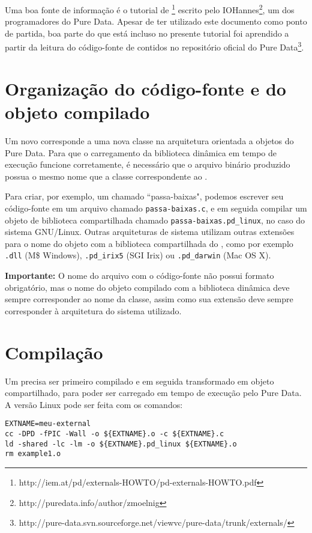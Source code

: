 Uma boa fonte de informação é o tutorial de
\externals\footnote{http://iem.at/pd/externals-HOWTO/pd-externals-HOWTO.pdf}
escrito pelo IOHannes\footnote{http://puredata.info/author/zmoelnig}, um dos
programadores do Pure Data. Apesar de ter utilizado este documento como ponto
de partida, boa parte do que está incluso no presente tutorial foi aprendido a
partir da leitura do código-fonte de \externals contidos no repositório
oficial do Pure
Data\footnote{http://pure-data.svn.sourceforge.net/viewvc/pure-data/trunk/externals/}.

\section{Organização do código-fonte e do objeto compilado}

Um novo \external corresponde a uma nova classe na arquitetura orientada a
objetos do Pure Data. Para que o carregamento da biblioteca dinâmica
em tempo de execução funcione corretamente, é necessário que o
arquivo binário produzido possua o mesmo nome que a classe correspondente ao
\external.

Para criar, por exemplo, um \external chamado ``passa-baixas", podemos
escrever seu código-fonte em um arquivo chamado \texttt{passa-baixas.c}, e em
seguida compilar um objeto de biblioteca compartilhada chamado
\texttt{passa-baixas.pd\_linux}, no caso do sistema GNU/Linux. Outras
arquiteturas de sistema utilizam outras extensões para o nome do objeto com a
biblioteca compartilhada do \external, como por exemplo \texttt{.dll} (M\$
Windows), \texttt{.pd\_irix5} (SGI Irix) ou \texttt{.pd\_darwin} (Mac OS X).

\textbf{Importante:} O nome do arquivo com o código-fonte não possui formato
obrigatório, mas o nome do objeto compilado com a biblioteca dinâmica deve
sempre corresponder ao nome da classe, assim como sua extensão deve sempre
corresponder à arquitetura do sistema utilizado.

\section{Compilação}

Um \external precisa ser primeiro compilado e em seguida transformado em
objeto compartilhado, para poder ser carregado em tempo de execução pelo Pure
Data. A versão Linux pode ser feita com os comandos:

\vspace{1em}
\begin{lstlisting}
EXTNAME=meu-external
cc -DPD -fPIC -Wall -o ${EXTNAME}.o -c ${EXTNAME}.c
ld -shared -lc -lm -o ${EXTNAME}.pd_linux ${EXTNAME}.o
rm example1.o
\end{lstlisting}

